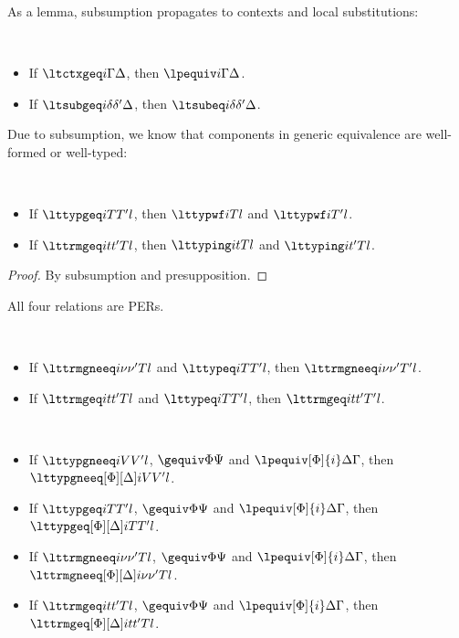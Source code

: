 As a lemma, subsumption propagates to contexts and local substitutions:
\begin{lemma}[Subsumption] $ $
  \begin{itemize}
  \item If $\ltctxgeq i \Gamma \Delta$, then $\lpequiv i \Gamma \Delta$. 
  \item If $\ltsubgeq i \delta {\delta'} \Delta$, then $\ltsubeq i \delta {\delta'} \Delta$.  
  \end{itemize}
\end{lemma}

Due to subsumption, we know that components in generic equivalence are well-formed or
well-typed:
\begin{lemma}[Presupposition] $ $
  \begin{itemize}
  \item If $\lttypgeq i T{T'} l$, then $\lttypwf i T l$ and $\lttypwf i{T'} l$.
  \item If $\lttrmgeq i t{t'} T l$, then $\lttyping i t T l$ and $\lttyping i{t'}T
    l$. 
  \end{itemize}
\end{lemma}
\begin{proof}
  By subsumption and presupposition. 
\end{proof}

\begin{law}[PER]
  All four relations are PERs. 
\end{law}

\begin{law} $ $
  \begin{itemize}
  \item If $\lttrmgneeq i \nu {\nu'} T l$ and $\lttypeq i T{T'} l$, then $\lttrmgneeq i \nu {\nu'}{T'} l$.
  \item If $\lttrmgeq i t {t'} T l$ and $\lttypeq i T{T'} l$, then $\lttrmgeq i t
    {t'}{T'} l$.
  \end{itemize}
\end{law}

\begin{law} $ $
  \begin{itemize}
  \item If $\lttypgneeq i V {V'} l$, $\gequiv\Phi\Psi$ and
    $\lpequiv[\Phi]{i}\Delta\Gamma$, then $\lttypgneeq[\Phi][\Delta] i V {V'} l$.
  \item If $\lttypgeq i T{T'} l$, $\gequiv\Phi\Psi$ and
    $\lpequiv[\Phi]{i}\Delta\Gamma$, then $\lttypgeq[\Phi][\Delta] i T{T'} l$.
  \item If $\lttrmgneeq i \nu {\nu'} T l$, $\gequiv\Phi\Psi$ and
    $\lpequiv[\Phi]{i}\Delta\Gamma$, then $\lttrmgneeq[\Phi][\Delta] i \nu {\nu'}{T} l$.
  \item If $\lttrmgeq i t {t'} T l$, $\gequiv\Phi\Psi$ and
    $\lpequiv[\Phi]{i}\Delta\Gamma$, then $\lttrmgeq[\Phi][\Delta] i t {t'}{T} l$.
  \end{itemize}
\end{law}

